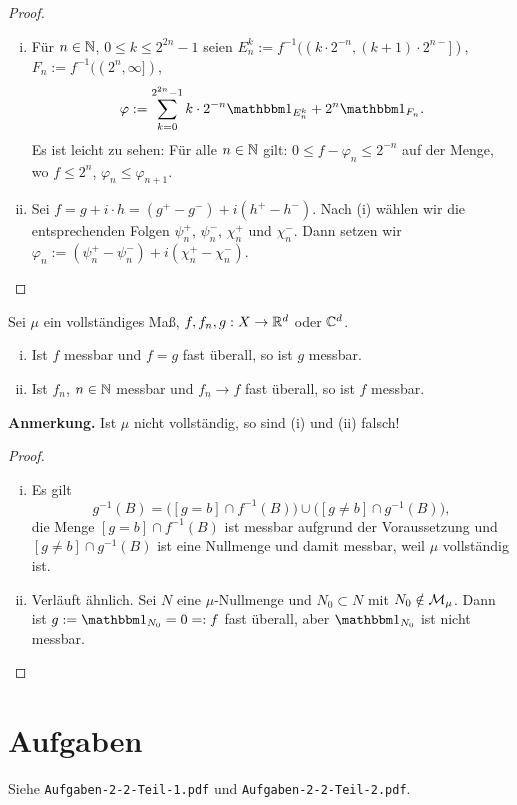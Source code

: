\documentclass[
 a4paper,
 12pt,
 parskip=half
 ]{scrreprt}
\theoremstyle{plain}
\theoremstyle{definition}
\numberwithin{equation}{section}
\begin{document}
\begin{proof}
 \begin{enumerate}[(i)]
  \item Für $n \in \mathbb{N}$, $0 \le k \le 2^{2n}-1$ seien $E_n^k := f^{-1} (( k \cdot 2^{-n} , (k+1) \cdot 2^{n-} ] )$, $F_n := f^{-1}((2^n, \infty])$, 
  \[ \varphi := \sum_{k=0}^{2^{2n} - 1} k \cdot 2^{-n} \ind_{E_n^k} + 2^n \ind_{F_n}. \]
  Es ist leicht zu sehen: Für alle $n \in \mathbb{N}$ gilt: $0 \le f - \varphi_n \le 2^{-n}$ auf der Menge, wo $f \le 2^n$, $\varphi_n \le \varphi_{n+1}$.
  \item Sei $f = g + i \cdot h = (g^+ - g^-) + i( h^+ - h^- )$. Nach (i) wählen wir die entsprechenden Folgen $\psi_n^+$, $\psi_n^-$, $\chi_n^+$ und $\chi_n^-$. Dann setzen wir $\varphi_n := (\psi_n^+  - \psi_n^-) + i(\chi_n^+ - \chi_n^-)$. \qedhere
 \end{enumerate}
\end{proof}

\begin{lem}
 Sei $\mu$ ein vollständiges Maß, $f,f_n,g: X \to \mathbb{R}^d$ oder $\mathbb{C}^d$.
 \begin{enumerate}[(i)]
  \item Ist $f$ messbar und $f=g$ fast überall, so ist $g$ messbar.
  \item Ist $f_n$, $n \in \mathbb{N}$ messbar und $f_n \to f$ fast überall, so ist $f$ messbar.
 \end{enumerate}
\end{lem}

\textbf{Anmerkung.}
Ist $\mu$ nicht vollständig, so sind (i) und (ii) falsch!

\begin{proof}
 \begin{enumerate}[(i)]
  \item Es gilt
  \[ g^{-1}(B) = \Big( [g=b] \cap f^{-1}(B) \Big) \cup \Big( [g \ne b] \cap g^{-1}(B) \Big), \]
  die Menge $[g=b] \cap f^{-1}(B)$ ist messbar aufgrund der Voraussetzung und $[g \ne b] \cap g^{-1}(B)$ ist eine Nullmenge und damit messbar, weil $\mu$ vollständig ist.
  \item Verläuft ähnlich. Sei $N$ eine $\mu$-Nullmenge und $N_0 \subset N$ mit $N_0 \notin \mathcal{M}_\mu$. Dann ist $g := \ind_{N_0} = 0 =: f$ fast überall, aber $\ind_{N_0}$ ist nicht messbar. \qedhere
 \end{enumerate}
\end{proof}

\section{Aufgaben}
Siehe \verb+Aufgaben-2-2-Teil-1.pdf+ und \verb+Aufgaben-2-2-Teil-2.pdf+.
\end{document}
